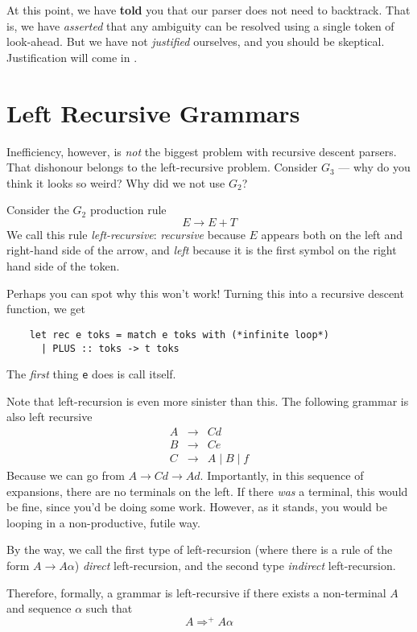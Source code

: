 At this point, we have \textbf{told} you that our parser does not need to backtrack. That is, we have \textit{asserted} that any ambiguity can be resolved using a single token of look-ahead. But we have not \textit{justified} ourselves, and you should be skeptical. Justification will come in .

\section{Left Recursive Grammars}
Inefficiency, however, is \textit{not} the biggest problem with recursive descent parsers. That dishonour belongs to the left-recursive problem. Consider $G_3$ --- why do you think it looks so weird? Why did we not use $G_2$?

Consider the $G_2$ production rule
\[ E \rightarrow E + T \]
We call this rule \textit{left-recursive}: \textit{recursive} because $E$ appears both on the left and right-hand side of the arrow, and \textit{left} because it is the first symbol on the right hand side of the token.

Perhaps you can spot why this won't work! Turning this into a recursive descent function, we get 
\begin{verbatim}
    let rec e toks = match e toks with (*infinite loop*)
      | PLUS :: toks -> t toks
\end{verbatim}

The \textit{first} thing \texttt{e} does is call itself. 

Note that left-recursion is even more sinister than this. The following grammar is also left recursive
\[\begin{array}{lcl}
     A & \rightarrow & Cd  \\
     B & \rightarrow & Ce \\
     C & \rightarrow & A \mid B \mid f
\end{array}\]
Because we can go from $A \rightarrow Cd \rightarrow Ad$. Importantly, in this sequence of expansions, there are no terminals on the left. If there \textit{was} a terminal, this would be fine, since you'd be doing some work. However, as it stands, you would be looping in a non-productive, futile way.

By the way, we call the first type of left-recursion (where there is a rule of the form $A \rightarrow A\alpha$) \textit{direct} left-recursion, and the second type \textit{indirect} left-recursion.

Therefore, formally, a grammar is left-recursive if there exists a non-terminal $A$ and sequence $\alpha$ such that
\[ A \Rightarrow^{+} A\alpha \]
